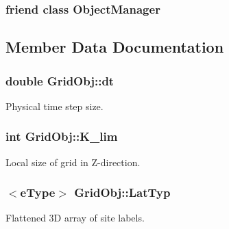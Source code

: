 \subsubsection[{\texorpdfstring{Object\+Manager}{ObjectManager}}]{\setlength{\rightskip}{0pt plus 5cm}friend class {\bf Object\+Manager}\hspace{0.3cm}{\ttfamily [friend]}}\hypertarget{class_grid_obj_a8b86bdcdb7c54a536293d8632363e114}{}\label{class_grid_obj_a8b86bdcdb7c54a536293d8632363e114}


\subsection{Member Data Documentation}
\subsubsection[{\texorpdfstring{dt}{dt}}]{\setlength{\rightskip}{0pt plus 5cm}double Grid\+Obj\+::dt}\hypertarget{class_grid_obj_afd504b39f12eb0a237bc6313de94e094}{}\label{class_grid_obj_afd504b39f12eb0a237bc6313de94e094}


Physical time step size. 

\subsubsection[{\texorpdfstring{K\+\_\+lim}{K_lim}}]{\setlength{\rightskip}{0pt plus 5cm}int Grid\+Obj\+::\+K\+\_\+lim}\hypertarget{class_grid_obj_aaccc404f2fbdbaef8c5dd134f7d9e17f}{}\label{class_grid_obj_aaccc404f2fbdbaef8c5dd134f7d9e17f}


Local size of grid in Z-\/direction. 

\subsubsection[{\texorpdfstring{Lat\+Typ}{LatTyp}}]{$<${\bf e\+Type}$>$ Grid\+Obj\+::\+Lat\+Typ}\hypertarget{class_grid_obj_a8ce077fba648f767361039eb924c45ae}{}\label{class_grid_obj_a8ce077fba648f767361039eb924c45ae}


Flattened 3D array of site labels. 


